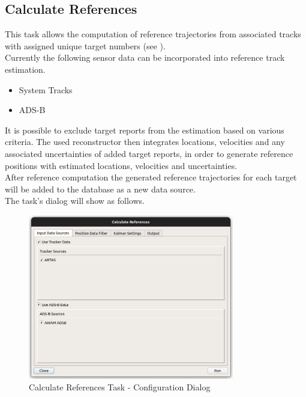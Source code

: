 
\subsection{Calculate References}
\label{sec:ui_proc_calc_references}

This task allows the computation of reference trajectories from associated tracks with assigned unique target numbers (see ). \\

Currently the following sensor data can be incorporated into reference track estimation.

\begin{itemize}
    \item System Tracks
    \item ADS-B \\
\end{itemize}

It is possible to exclude target reports from the estimation based on various criteria. 
The used reconstructor then integrates locations, velocities and any associated uncertainties of 
added target reports, in order to generate reference positions with estimated locations, velocities and uncertainties. \\

After reference computation the generated reference trajectories for each target will be added to the database 
as a new data source. \\

The task's dialog will show as follows. \\

\begin{figure}[H]
    \center
      \includegraphics[width=9cm]{figures/ui_task_references_dialog.png}
    \caption{Calculate References Task - Configuration Dialog}
\end{figure}

